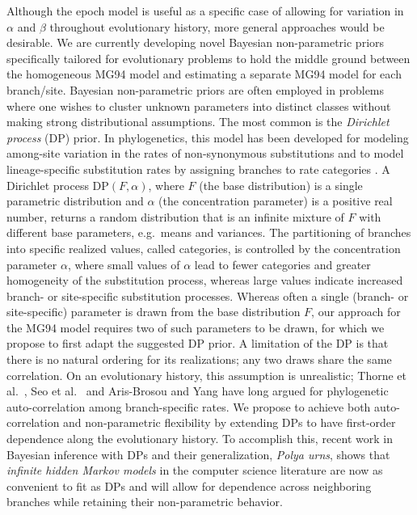 Although the epoch model is useful as a specific case of allowing for variation in $\alpha$ and $\beta$ throughout evolutionary history, more general approaches would be desirable.
We are currently developing novel Bayesian non-parametric priors specifically tailored for evolutionary problems to hold the middle ground between the homogeneous MG94 model and estimating a separate MG94 model for each branch/site.
Bayesian non-parametric priors are often employed in problems where one wishes to cluster unknown parameters into distinct classes without making strong distributional assumptions.
The most common is the \emph{Dirichlet process} (DP) prior. 
In phylogenetics, this model has been developed for modeling among-site variation in the rates of non-synonymous substitutions \citep{Huelsenbeck2006} and to model lineage-specific substitution rates by assigning branches to rate categories \citep{Heath2012}.
A Dirichlet process DP$(F, \alpha)$, where $F$ (the base distribution) is a single parametric distribution and $\alpha$ (the concentration parameter) is a positive real number, returns a random distribution that is an infinite mixture of $F$ with different base parameters, e.g.~means and variances.
The partitioning of branches into specific realized values, called categories, is controlled by the concentration parameter $\alpha$, where small values of $\alpha$ lead to fewer categories and greater homogeneity of the substitution process, whereas large values indicate increased branch- or site-specific substitution processes.
Whereas often a single (branch- or site-specific) parameter is drawn from the base distribution $F$, our approach for the MG94 model requires two of such parameters to be drawn, for which we propose to first adapt the suggested DP prior.
A limitation of the DP is that there is no natural ordering for its realizations; any two draws share the same correlation.  
On an evolutionary history, this assumption is unrealistic; Thorne et al.~\citep{Thorne1998}, Seo et al.~\citep{SKT04} and Aris-Brosou and Yang \citep{Aris-Brosou2002} have long argued for phylogenetic auto-correlation among branch-specific rates.
We propose to achieve both auto-correlation and non-parametric flexibility by extending DPs to have first-order dependence along the evolutionary history.  
To accomplish this, recent work in Bayesian inference with DPs and their generalization, \emph{Polya urns}, \citep{Guha2010} shows that \emph{infinite hidden Markov models} \citep{Beal2002} in the computer science literature are now as convenient to fit as DPs and will allow for dependence across neighboring branches while retaining their non-parametric behavior.

